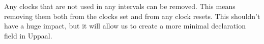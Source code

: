 Any clocks that are not used in any intervals can be removed.
This means removing them both from the clocks set and from any clock resets.
This shouldn't have a huge impact, but it will allow us to create a more minimal declaration field in Uppaal.

